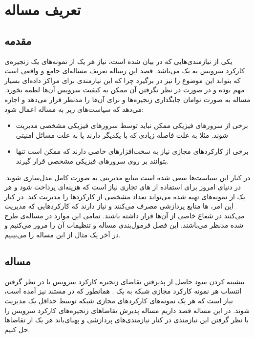 \chapter{تعریف مساله}

\section{مقدمه}
یکی از نیازمندی‌هایی که در \cite{ETSI-MAN} بیان شده است،
نیاز هر یک از نمونه‌های یک زنجیره‌ی کارکرد سرویس به یک 
می‌باشد.
قصد این رساله تعریف مساله‌ای جامع و واقعی است که بتواند این موضوع را نیز در برگیرد
چرا که این نیازمندی برای مراکز داده‌ای بسیار مهم بوده
و در صورت در نظر نگرفتن آن ممکن به کیفیت سرویس آن‌ها لطمه بخورد.
مساله به صورت توامان جایگذاری زنجیره‌ها و  برای آن‌ها را مدنظر قرار می‌دهد و
اجازه می‌دهد که سیاست‌های زیر به مساله اعمال شود:

\begin{itemize}
    \item
    برخی از سرورهای فیزیکی ممکن نباید توسط سرورهای فیزیکی مشخصی مدیریت شوند.
    مثلا به علت فاصله زیادی که با یکدیگر دارند یا به علت مسائل امنیتی
    \item
    برخی از کارکردهای مجازی نیاز به سخت‌افزارهای خاصی دارند که ممکن است تنها بتوانند
    بر روی سرورهای فیزیکی مشخصی قرار گیرند.
\end{itemize}

در کنار این سیاست‌ها سعی شده است منابع مدیریتی به صورت کامل مدل‌سازی شوند.
در دنیای امروز برای استفاده از های تجاری نیاز است
که هزینه‌ای پرداخت شود و هر یک از نمونه‌های تهیه شده می‌تواند تعداد مشخصی از کارکردها را مدیریت کند.
در کنار این امر، ها منابع پردازشی مصرف می‌کنند و
نیاز دارند که کارکردهایی که مدیریت می‌کنند در شعاع خاصی از آن‌ها قرار داشته باشند. تمامی این موارد در مساله‌ی طرح شده مدنظر می‌باشند.
این فصل فرمول‌بندی مساله و تنظیمات آن را مرور می‌کنیم و در آخر یک مثال از این مساله را می‌بینیم.
 
\section{مساله}

بیشینه کردن سود حاصل از پذیرفتن تقاضای زنجیره‌ کارکرد سرویس با در نظر گرفتن انتساب هر نمونه کارکرد مجازی شبکه به یک .
همانطور که در مستند \cite{ETSI-MAN} نیز آمده است، نیاز است که هر یک نمونه‌های کارکردهای مجازی شبکه
توسط حداقل یک  مدیریت شوند.
در این مساله قصد داریم مساله پذیرش تقاضاهای زنجیره‌های کارکرد سرویس را با نظر گرفتن این نیازمندی در کنار
نیازمندی‌های پردازشی و پهنای‌باند هر یک از تقاضاها حل کنیم.


